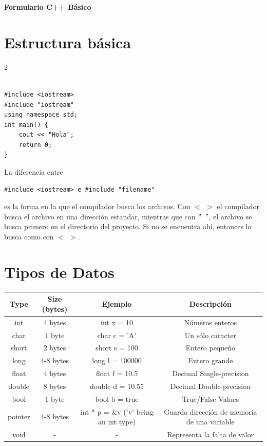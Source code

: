 \documentclass[a4paper,11pt]{article}
\begin{document}
\begin{center}
    {\Large \textbf{Formulario C++ Básico}}\\
\end{center}


\section*{Estructura básica}
\begin{multicols}{2}
\begin{lstlisting}  
  
#include <iostream> 
#include "iostream"
using namespace std;
int main() {
    cout << "Hola";
    return 0;
}
\end{lstlisting}

\columnbreak

La diferencia entre 
\begin{lstlisting}
#include <iostream> e #include "filename" 
\end{lstlisting}

es la forma en la que el compilador busca los archivos. 
Con \textbf{$<$ $>$} el compilador busca el archivo en una dirección estandar, 
mientras que con \textbf{$"$ $"$}, el archivo se busca primero en el directorio del proyecto.
Si no se encuentra ahí, entonces lo busca como con \textbf{$<$ $>$}.

\end{multicols}


\section*{Tipos de Datos}
\begin{center}
\begin{tabular}{| c | c | c | c |}
        \hline
        Type & Size (bytes) & Ejemplo & Descripción\\
        \hline\hline
        int & 4 bytes & int x = 10 & Números enteros \\
        \hline
        char & 1 byte & char c = 'A' & Un sólo caracter \\
        \hline
        short & 2 bytes & short s = 100 & Entero pequeño \\
        \hline
        long & 4-8 bytes & long l = 100000 & Entero grande \\
        \hline
        float & 4 bytes & float f = 10.5 & Decimal Single-precision \\
        \hline 
        double & 8 bytes & double d = 10.55 & Decimal Double-precision \\
        \hline
        bool & 1 byte & bool b = true & True/False Values \\
        \hline
        pointer & 4-8 bytes & int * p = \&v ('v' being an int type) & Guarda dirección de memoria de una variable\\
        \hline
        void & - & - & Representa la falta de valor \\
        \hline
\end{tabular}
\end{center}
    
\end{document}
